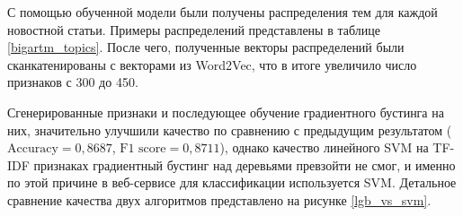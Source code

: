 \documentclass[a4paper, 14pt]{extarticle}
\begin{document}
С помощью обученной модели были получены распределения тем для каждой новостной статьи.
Примеры распределений представлены в таблице \ref{bigartm_topics}. После чего, полученные векторы распределений
были сканкатенированы с векторами из Word2Vec, что в итоге увеличило число признаков с 300 до 450.

\begin{table}[h!]
	\caption{Пример распределений слов в темах, полученных вероятностным тематическим моделированием, с помощью библиотеки bigARTM}
	\label{bigartm_topics}
\end{table}

Сгенерированные признаки и последующее обучение градиентного бустинга на них, значительно улучшили качество по сравнению
с предыдущим результатом ($\text{Accuracy} = 0,8687$, $\text{F1 score} = 0,8711$), однако качество линейного SVM на TF-IDF признаках
градиентный бустинг над деревьями превзойти не смог, и именно по этой причине в веб-сервисе для классификации используется SVM.
Детальное сравнение качества двух алгоритмов представлено на рисунке \ref{lgb_vs_svm}.
\end{document}
